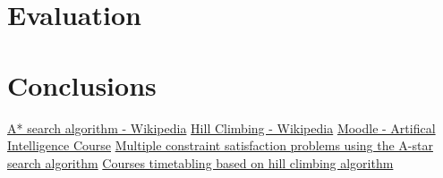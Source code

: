 \documentclass[runningheads]{paper}
\begin{document}

\section{Evaluation}

\section{Conclusions}


\pagebreak

\begin{thebibliography}{8}
    \bibitem{}
    \href{https://en.wikipedia.org/wiki/A*_search_algorithm#Complexity}{A* search algorithm - Wikipedia}
    \bibitem{}
    \href{https://en.wikipedia.org/wiki/Hill_climbing}{Hill Climbing - Wikipedia}
    \bibitem{}
    \href{https://curs.upb.ro/2023/course/view.php?id=13749}{Moodle - Artifical Intelligence Course}
    \bibitem{}
    \href{https://www.researchgate.net/profile/Kian-Pokorny/publication/262277120_Multiple_constraint_satisfaction_problems_using_the_A-star_A_search_algorithm_classroom_scheduling_with_preferences/links/5e57f530299bf1bdb8408b03/Multiple-constraint-satisfaction-problems-using-the-A-star-A-search-algorithm-classroom-scheduling-with-preferences.pdf}{Multiple constraint satisfaction problems using the A-star search algorithm}
    \bibitem{}
    \href{https://d1wqtxts1xzle7.cloudfront.net/68245993/14443-libre.pdf?1626958962=&response-content-disposition=inline%3B+filename%3DCourses_timetabling_based_on_hill_climbi.pdf&Expires=1714507660&Signature=JDd-gaDdE4E7s5P66Op535FyEuysvPoA5o4fcwak4NWT1sQNtVh50ooYa9eSrHu~aHR-Ulabenz910uDjozKpgHivCFkhipTT5bJJL9MensZTSib8TBVzGtBU9lycqCVwilt21Udi0DMgfhERDSgCcR4vO8hmlFlxOLg1exD1fNLE8kxt4S0H2Qfb3nQEHu3kLsicuJNk8wfF~eWpEDUlWsjW9J9IpxuLWP0OICQ7ZReWtx37dHnPN2PTVmFs815NMNi-jyLV0gWWBTAOL7Hn7A5VSg-l~s2e8RAoCjPAYQDRnnznIzOElRy2nTsgkW3mZDzlsntJ3lFur2KquwqNg__&Key-Pair-Id=APKAJLOHF5GGSLRBV4ZA}{Courses timetabling based on hill climbing algorithm}
    
    \end{thebibliography}
\end{document}
